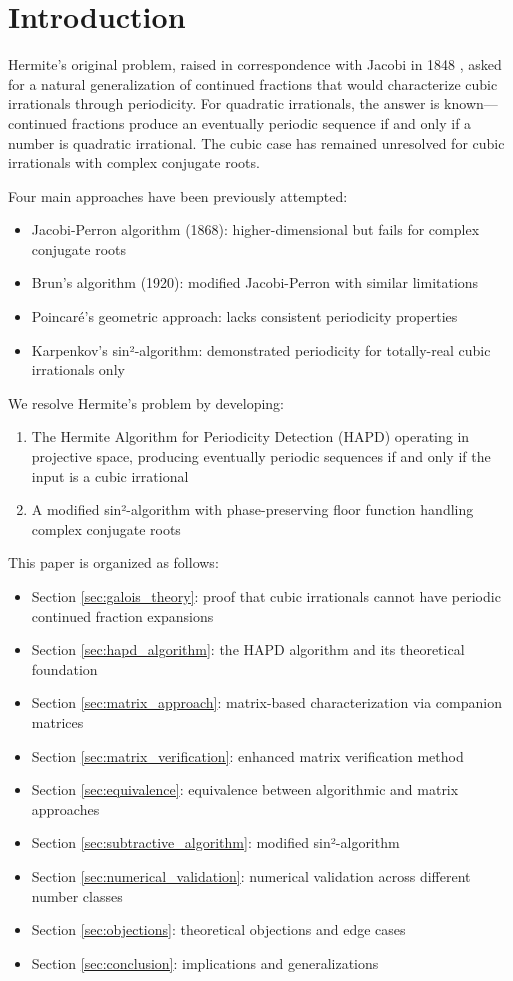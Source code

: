 \section{Introduction}\label{sec:intro}

Hermite's original problem, raised in correspondence with Jacobi in 1848 \cite{Hermite1848}, asked for a natural generalization of continued fractions that would characterize cubic irrationals through periodicity. For quadratic irrationals, the answer is known—continued fractions produce an eventually periodic sequence if and only if a number is quadratic irrational. The cubic case has remained unresolved for cubic irrationals with complex conjugate roots.

Four main approaches have been previously attempted:
\begin{itemize}
\item Jacobi-Perron algorithm (1868): higher-dimensional but fails for complex conjugate roots
\item Brun's algorithm (1920): modified Jacobi-Perron with similar limitations
\item Poincaré's geometric approach: lacks consistent periodicity properties
\item Karpenkov's sin²-algorithm: demonstrated periodicity for totally-real cubic irrationals only
\end{itemize}

We resolve Hermite's problem by developing:
\begin{enumerate}
\item The Hermite Algorithm for Periodicity Detection (HAPD) operating in projective space, producing eventually periodic sequences if and only if the input is a cubic irrational
\item A modified sin²-algorithm with phase-preserving floor function handling complex conjugate roots
\end{enumerate}

This paper is organized as follows:
\begin{itemize}
\item Section \ref{sec:galois_theory}: proof that cubic irrationals cannot have periodic continued fraction expansions
\item Section \ref{sec:hapd_algorithm}: the HAPD algorithm and its theoretical foundation
\item Section \ref{sec:matrix_approach}: matrix-based characterization via companion matrices
\item Section \ref{sec:matrix_verification}: enhanced matrix verification method
\item Section \ref{sec:equivalence}: equivalence between algorithmic and matrix approaches
\item Section \ref{sec:subtractive_algorithm}: modified sin²-algorithm
\item Section \ref{sec:numerical_validation}: numerical validation across different number classes
\item Section \ref{sec:objections}: theoretical objections and edge cases
\item Section \ref{sec:conclusion}: implications and generalizations
\end{itemize}
